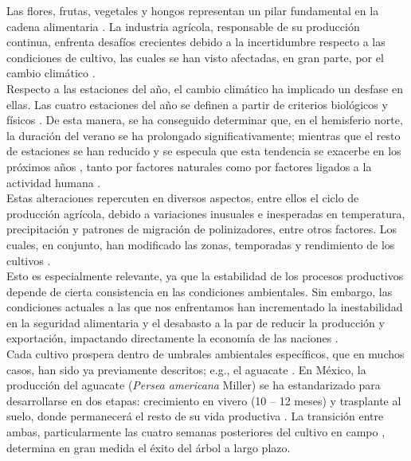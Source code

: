 Las flores, frutas, vegetales y hongos representan un pilar fundamental en la cadena alimentaria \cite{Cassani_2022}. La industria agrícola, responsable de su producción continua, enfrenta desafíos crecientes debido a la incertidumbre respecto a las condiciones de cultivo, las cuales se han visto afectadas, en gran parte, por el cambio climático \cite{Parajuli_2019}.\\


Respecto a las estaciones del año, el cambio climático ha implicado un desfase en ellas. Las cuatro estaciones del año se definen a partir de criterios biológicos y físicos \cite{Trenberth_1983}. De esta manera, se ha conseguido determinar que, en el hemisferio norte, la duración del verano se ha prolongado significativamente; mientras que el resto de estaciones se han reducido y se especula que esta tendencia se exacerbe en los próximos años \cite{Wang_2021}, tanto por factores naturales como por factores ligados a la actividad humana \cite{Park_2018}.\\

Estas alteraciones repercuten en diversos aspectos, entre ellos el ciclo de producción agrícola, debido a variaciones inusuales e inesperadas en temperatura, precipitación y patrones de migración de polinizadores, entre otros factores. Los cuales, en conjunto, han modificado las zonas, temporadas y rendimiento de los cultivos \cite{Bayable_2021, Cuevas_2021, Parajuli_2019}.\\

Esto es especialmente relevante, ya que la estabilidad de los procesos productivos depende de cierta consistencia en las condiciones ambientales. Sin embargo, las condiciones actuales a las que nos enfrentamos han incrementado la inestabilidad en la seguridad alimentaria y el desabasto a la par de reducir la producción y exportación, impactando directamente la economía de las naciones \cite{Farooq_2022}.\\


Cada cultivo prospera dentro de umbrales ambientales específicos, que en muchos casos, han sido ya previamente descritos; e.g., el aguacate \cite{Moraes_2022, Rocha-Arroyo_2011}. En México, la producción del aguacate (\textit{Persea americana} Miller) se ha estandarizado para desarrollarse en dos etapas: crecimiento en vivero (10 -- 12 meses) y trasplante al suelo, donde permanecerá el resto de su vida productiva \cite{SAGARPA_2017}. La transición entre ambas, particularmente las cuatro semanas posteriores del cultivo en campo \cite{Premkumar_2002}, determina en gran medida el éxito del árbol a largo plazo.\\

